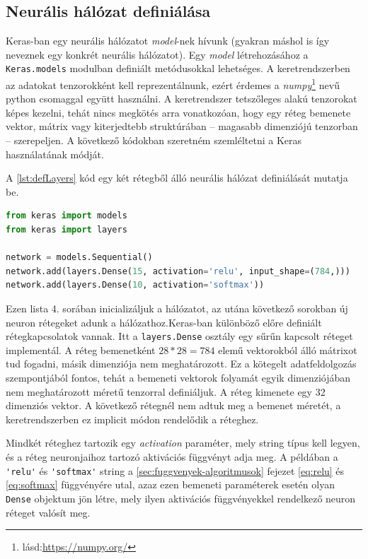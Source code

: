 \subsection{Neurális hálózat definiálása}
Keras-ban egy neurális hálózatot \emph{model}-nek hívunk (gyakran máshol is így neveznek egy konkrét neurális hálózatot). Egy \emph{model} létrehozásához a \verb|Keras.models| modulban definiált metódusokkal lehetséges. A keretrendszerben az adatokat tenzorokként kell reprezentálnunk, ezért érdemes a \emph{numpy}\footnote{lásd:\url{https://numpy.org/}} nevű python csomaggal együtt használni. A keretrendszer tetszőleges alakú tenzorokat képes kezelni, tehát nincs megkötés arra vonatkozóan, hogy egy réteg bemenete vektor, mátrix vagy kiterjedtebb struktúrában -- magasabb dimenziójú tenzorban -- szerepeljen. A következő kódokban szeretném szemléltetni a Keras használatának módját.

A \ref{lst:defLayers} kód egy két rétegből álló neurális hálózat definiálását mutatja be.
\begin{minipage}{\textwidth}
\begin{lstlisting}[language=Python, caption=Neurális hálózat rétegeinek definiálása]
from keras import models
from keras import layers

network = models.Sequential()
network.add(layers.Dense(15, activation='relu', input_shape=(784,)))
network.add(layers.Dense(10, activation='softmax'))
\end{lstlisting}\label{lst:defLayers}
\end{minipage}
Ezen lista 4. sorában inicializáljuk a hálózatot, az utána következő sorokban új neuron rétegeket adunk a hálózathoz.Keras-ban különböző előre definiált rétegkapcsolatok vannak. Itt a \verb|layers.Dense| osztály egy sűrűn kapcsolt réteget implementál. %
A réteg bemenetként $28 *28 = 784$ elemű vektorokból álló mátrixot tud fogadni, másik dimenziója nem meghatározott. Ez a kötegelt adatfeldolgozás szempontjából fontos, tehát a bemeneti vektorok folyamát egyik dimenziójában nem meghatározott méretű tenzorral definiáljuk. A réteg kimenete egy 32 dimenziós vektor. A következő rétegnél nem adtuk meg a bemenet méretét, a keretrendszerben ez implicit módon rendelődik a réteghez. 

Mindkét réteghez tartozik egy \emph{activation} paraméter, mely string típus kell legyen, és a réteg neuronjaihoz tartozó aktivációs függvényt adja meg. A példában a \verb|'relu'| és \verb|'softmax'| string a \ref{sec:fuggvenyek-algoritmusok} fejezet \eqref{eq:relu} és \eqref{eq:softmax} függvényére utal, azaz ezen bemeneti paraméterek esetén olyan \verb|Dense| objektum jön létre, mely ilyen aktivációs függvényekkel rendelkező neuron réteget valósít meg.

